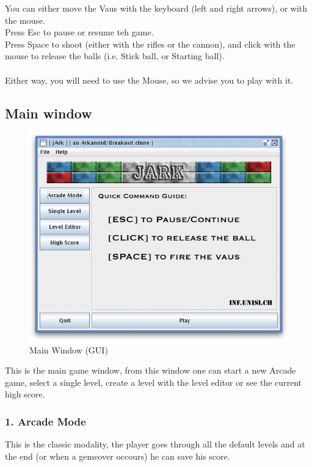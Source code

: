 \documentclass[12pt]{article}
\begin{document}
You can either move the Vaus with the keyboard (left and right arrows), or with the mouse. \\
Press Esc to pause or resume teh game.\\
Press Space to shoot (either with the rifles or the cannon), and click with the mouse to release the balls (i.e. Stick ball, or Starting ball).\\
\\
Either way, you will need to use the Mouse, so we advise you to play with it.\\

\newpage
\subsection{Main window}

\begin{figure}[htbp]
  \centering
    \includegraphics[scale=0.6]{mainscreen.png}
  \caption{Main Window (GUI)}
  \label{guimain}
\end{figure}
This is the main game window, from this window one can start a new Arcade game, select a single level, create a level with the level editor or see the current high score.\\
\newpage

\subsubsection*{1. Arcade Mode}
This is the classic modality, the player goes through all the default levels and at the end (or when a gemeover occours) he can save his score.\\
\end{document}
